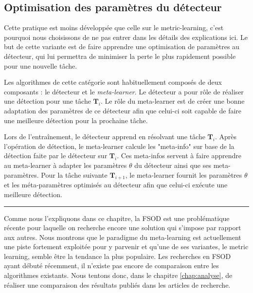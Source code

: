 \subsection{Optimisation des paramètres du détecteur}
Cette pratique est moins développée que celle sur le metric-learning, c'est pourquoi nous choisissons de ne pas entrer dans les détails des explications ici. Le but de cette variante est de faire apprendre une optimisation de paramètres au détecteur, qui lui permettra de minimiser la perte le plus rapidement possible pour une nouvelle tâche. 

Les algorithmes de cette catégorie sont habituellement composés de deux composants : le détecteur et le \textit{meta-learner}. Le détecteur a pour rôle de réaliser une détection pour une tâche $\textbf{T}_i$. Le rôle du meta-learner est de créer une bonne adaptation des paramètres de ce détecteur afin que celui-ci soit capable de faire une meilleure détection pour la prochaine tâche.

Lors de l'entraînement, le détecteur apprend en résolvant une tâche $\textbf{T}_i$. Après l'opération de détection, le meta-learner calcule les "meta-info" sur base de la détection faite par le détecteur sur $\textbf{T}_i$. Ces meta-infos servent à faire apprendre au meta-learner à adapter les paramètres $\theta$ du détecteur ainsi que ses meta-paramètres. Pour la tâche suivante $\textbf{T}_{i+1}$, le meta-learner fournit les paramètres $\theta$ et les méta-paramètres optimisés au détecteur afin que celui-ci exécute une meilleure détection.

\hspace{1pt}
\par\noindent\rule{\textwidth}{0.4pt}

Comme nous l'expliquons dans ce chapitre, la FSOD est une problématique récente pour laquelle on recherche encore une solution qui s'impose par rapport aux autres. Nous montrons que le paradigme du meta-learning est actuellement une piste fortement exploitée pour y parvenir et qu'une de ses variantes, le metric learning, semble être la tendance la plus populaire. Les recherches en FSOD ayant débuté récemment, il n'existe pas encore de comparaison entre les algorithmes existants. Nous tentons donc, dans le chapitre \ref{chap:analyse}, de réaliser une comparaison des résultats publiés dans les articles de recherche.